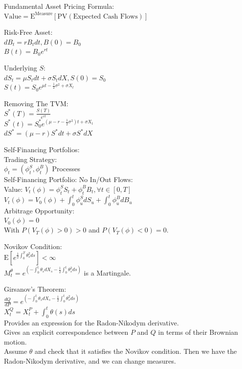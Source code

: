 Fundamental Asset Pricing Formula: \\
$\text{Value}=\text{E}^{\text{Measure}}[\text{PV}(\text{Expected Cash Flows})]$

Risk-Free Asset: \\
$dB_t=r B_t dt,B(0)=B_0$ \\
$B(t)=B_0 e^{rt}$

Underlying $S$: \\
$dS_t=\mu S_t dt+\sigma S_t dX, S(0)=S_0$ \\
$S(t)=S_0 e^{\mu t-\frac{1}{2} \sigma^2 + \sigma X_t}$

Removing The TVM: \\
$S^* (T) = \frac{S(T)}{e^{rt}}$ \\
$S^* (t) = S_0^* e^{(\mu-r-\frac{1}{2}\sigma^2)t+\sigma X_t}$ \\
$dS^* = (\mu-r)S^* dt+\sigma S^* dX$

Self-Financing Portfolios: \\
Trading Strategy: \\
$\phi_t = (\phi_t^S,\phi_t^B)$ Processes \\
Self-Financing Portfolio: No In/Out Flows: \\
Value: $V_t (\phi)=\phi_t^S S_t+\phi_t^B B_t, \forall t \in [0,T]$ \\
$V_t (\phi)=V_0 (\phi)+\int_0^t \phi_u^S dS_u + \int_0^t \phi_u^B dB_u$ \\
Arbitrage Opportunity: \\
$V_0 (\phi)=0$ \\
With $P(V_T (\phi)>0)>0$ and $P(V_T (\phi)<0)=0$.

Novikov Condition: \\
$\text{E}\left[ e^{\frac{1}{2} \int_0^T \theta_s^2 ds} \right] < \infty$ \\
$M_t^{\theta} = e^{(-\int_0^t \theta_s dX_s - \frac{1}{2} \int_0^t \theta_s^2 ds)}$ is a Martingale.

Girsanov's Theorem: \\
$\frac{dQ}{dP} = e^{(-\int_0^t \theta_s dX_s - \frac{1}{2} \int_0^t \theta_s^2 ds)}$ \\
$X_t^Q=X_t^P + \int_0^t \theta(s) ds$ \\
Provides an expression for the Radon-Nikodym derivative. \\
Gives an explicit correspondence between $P$ and $Q$ in terms of their Brownian motion. \\
Assume $\theta$ and check that it satisfies the Novikov condition. Then we have the Radon-Nikodym derivative, and we can change measures.

